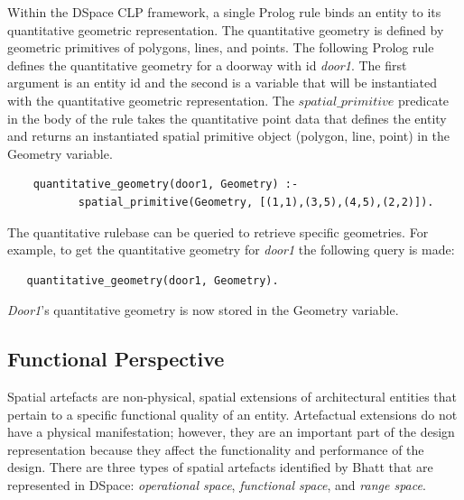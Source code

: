 \documentclass[12pt]{ucthesis}
\begin{document}
Within the DSpace CLP framework, a single Prolog rule binds an entity to its quantitative geometric representation. The quantitative geometry is defined by geometric primitives of polygons, lines, and points. The following Prolog rule defines the quantitative geometry for a doorway with id \emph{door1}. The first argument is an entity id and the second is a variable that will be instantiated with the quantitative geometric representation. The $spatial\_primitive$ predicate in the body of the rule takes the quantitative point data that defines the entity and returns an instantiated spatial primitive object (polygon, line, point) in the Geometry variable.
\begin{verbatim}
    quantitative_geometry(door1, Geometry) :-
           spatial_primitive(Geometry, [(1,1),(3,5),(4,5),(2,2)]).
\end{verbatim}

The quantitative rulebase can be queried to retrieve specific geometries. For example, to get the quantitative geometry for \emph{door1} the following query is made:
\begin{verbatim}
   quantitative_geometry(door1, Geometry).
\end{verbatim} 
\emph{Door1}'s quantitative geometry is now stored in the Geometry variable.


\subsection{Functional Perspective}
Spatial artefacts are non-physical, spatial extensions of architectural entities that pertain to a specific functional quality of an entity. Artefactual extensions do not have a physical manifestation; however, they are an important part of the design representation because they affect the functionality and performance of the design. There are three types of spatial artefacts identified by Bhatt\cite{Bhatt} that are represented in DSpace: \emph{operational space}, \emph{functional space}, and \emph{range space}.
\end{document}
